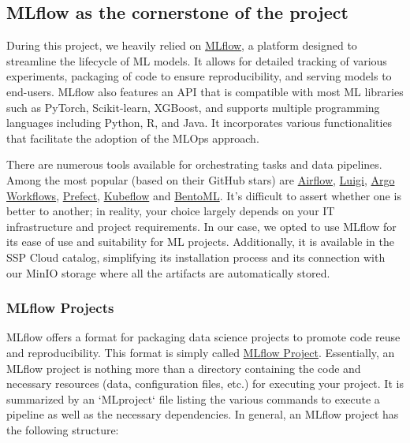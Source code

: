 \subsection{MLflow as the cornerstone of the project}

During this project, we heavily relied on \href{https://github.com/MLflow/MLflow}{MLflow}, a platform designed to streamline the lifecycle of ML models. It allows for detailed tracking of various experiments, packaging of code to ensure reproducibility, and serving models to end-users. MLflow also features an API that is compatible with most ML libraries such as PyTorch, Scikit-learn, XGBoost, and supports multiple programming languages including Python, R, and Java. It incorporates various functionalities that facilitate the adoption of the MLOps approach.

There are numerous tools available for orchestrating tasks and data pipelines. Among the most popular (based on their GitHub stars) are \href{https://github.com/apache/airflow}{Airflow}, \href{https://github.com/spotify/luigi}{Luigi}, \href{https://github.com/argoproj/argo-workflows}{Argo Workflows}, \href{https://github.com/PrefectHQ/prefect}{Prefect}, \href{https://github.com/kubeflow/kubeflow}{Kubeflow} and \href{https://github.com/bentoml/BentoML}{BentoML}. It's difficult to assert whether one is better to another; in reality, your choice largely depends on your IT infrastructure and project requirements. In our case, we opted to use MLflow for its ease of use and suitability for ML projects. Additionally, it is available in the SSP Cloud catalog, simplifying its installation process and its connection with our MinIO storage where all the artifacts are automatically stored.

\subsubsection{MLflow Projects}

MLflow offers a format for packaging data science projects to promote code reuse and reproducibility. This format is simply called \href{https://MLflow.org/docs/latest/projects.html}{MLflow Project}. Essentially, an MLflow project is nothing more than a directory containing the code and necessary resources (data, configuration files, etc.) for executing your project. It is summarized by an `MLproject` file listing the various commands to execute a pipeline as well as the necessary dependencies. In general, an MLflow project has the following structure:

